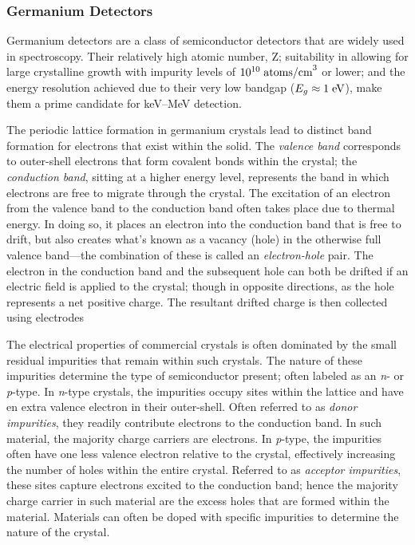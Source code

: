 \subsubsection{Germanium Detectors}

Germanium detectors are a class of semiconductor detectors that are widely used in \gray{} spectroscopy. Their relatively high atomic number, Z; suitability in allowing for large crystalline growth with impurity levels of $10^{10} \; \text{atoms/cm}^3$ or lower; and the energy resolution achieved due to their very low bandgap ($E_{g} \approx 1 \; \text{eV}$), make them a prime candidate for keV--MeV \gray{} detection. 

The periodic lattice formation in germanium crystals lead to distinct band formation for electrons that exist within the solid. The \textit{valence band} corresponds to outer-shell electrons that form covalent bonds within the crystal; the \textit{conduction band}, sitting at a higher energy level, represents the band in which electrons are free to migrate through the crystal. The excitation of an electron from the valence band to the conduction band often takes place due to thermal energy. In doing so, it places an electron into the conduction band that is free to drift, but also creates what's known as a vacancy (hole) in the otherwise full valence band---the combination of these is called an \textit{electron-hole} pair. The electron in the conduction band and the subsequent hole can both be drifted if an electric field is applied to the crystal; though in opposite directions, as the hole represents a net positive charge. The resultant drifted charge is then collected using electrodes

The electrical properties of commercial crystals is often dominated by the small residual impurities that remain within such crystals. The nature of these impurities determine the type of semiconductor present; often labeled as an \textit{n}- or \textit{p}-type. In \textit{n}-type crystals, the impurities occupy sites within the lattice and have en extra valence electron in their outer-shell. Often referred to as \textit{donor impurities}, they readily contribute electrons to the conduction band. In such material, the majority charge carriers are electrons. In \textit{p}-type, the impurities often have one less valence electron relative to the crystal, effectively increasing the number of holes within the entire crystal. Referred to as \textit{acceptor impurities}, these sites capture electrons excited to the conduction band; hence the majority charge carrier in such material are the excess holes that are formed within the material. Materials can often be doped with specific impurities to determine the nature of the crystal.


